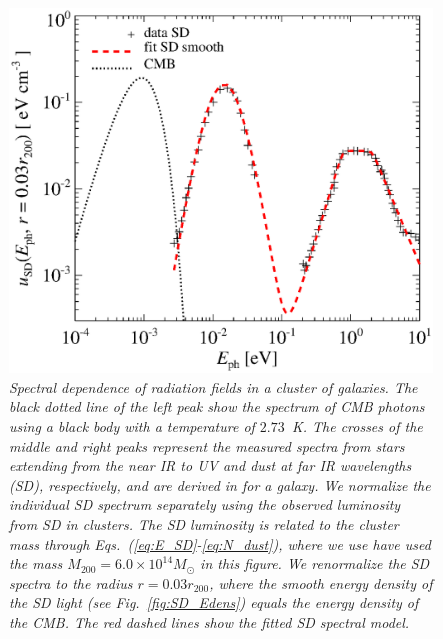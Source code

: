 \documentclass[10pt,aps,pra,reprint,amsmath,amsfonts,amssymb,showpacs,nofootinbib,floatfix]{revtex4-1}
\newcommand{\msun}{M_\odot}
\newcommand{\rvir}{r_{200}}
\newcommand{\mvir}{M_{200}}
\begin{document}
\begin{figure}%
 \includegraphics[width=0.99\columnwidth]{figures/fit.porter.v2.eps}
 \caption{\it Spectral dependence of radiation fields in a cluster of
   galaxies. The black dotted line of the left peak show the spectrum
   of CMB photons using a black body with a temperature of
   $2.73$~K. The crosses of the middle and right peaks represent the
   measured spectra from stars extending from the near IR to UV and
   dust at far IR wavelengths (SD), respectively, and are derived in
   \protect \cite{2006ApJ...648L..29P} for a galaxy. We normalize the
   individual SD spectrum separately using the observed luminosity
   from SD in clusters. The SD luminosity is related to the cluster
   mass through Eqs.~(\ref{eq:E_SD}-\ref{eq:N_dust}), where we use
   have used the mass $\mvir=6.0\times10^{14}\msun$ in this figure. We
   renormalize the SD spectra to the radius $r=0.03\rvir$, where the
   smooth energy density of the SD light (see Fig.~\ref{fig:SD_Edens})
   equals the energy density of the CMB. The red dashed lines show the
   fitted SD spectral model.}
 \label{fig:SD_spectra}
\end{figure}
\end{document}
